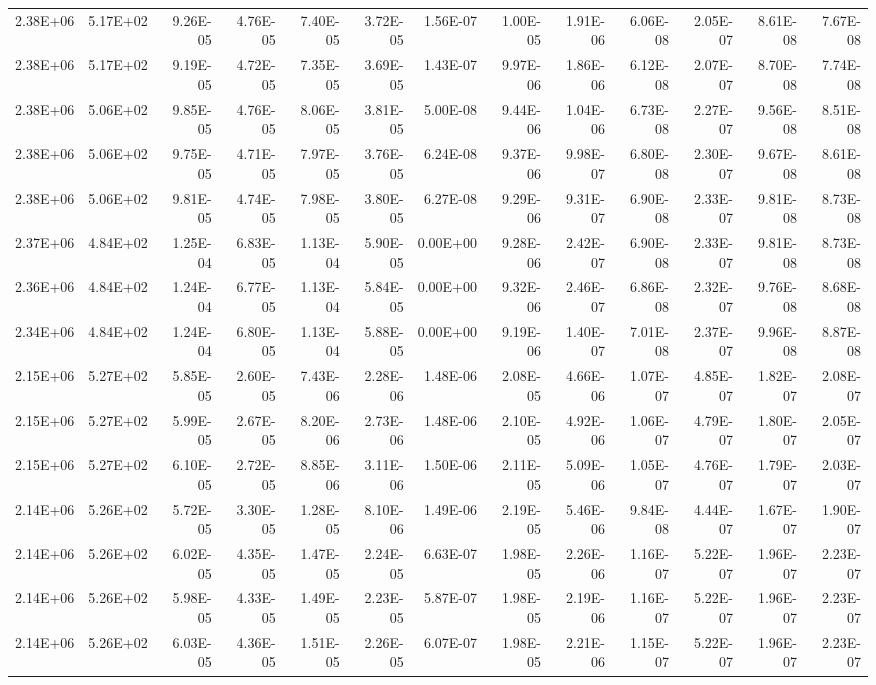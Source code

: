 \begin{tabular}{rrrrrrrrrrrrr}
2.38E+06 & 5.17E+02 & 9.26E-05 & 4.76E-05 & 7.40E-05 & 3.72E-05 & 1.56E-07 & 1.00E-05 & 1.91E-06 & 6.06E-08 & 2.05E-07 & 8.61E-08 & 7.67E-08 \\
2.38E+06 & 5.17E+02 & 9.19E-05 & 4.72E-05 & 7.35E-05 & 3.69E-05 & 1.43E-07 & 9.97E-06 & 1.86E-06 & 6.12E-08 & 2.07E-07 & 8.70E-08 & 7.74E-08 \\
2.38E+06 & 5.06E+02 & 9.85E-05 & 4.76E-05 & 8.06E-05 & 3.81E-05 & 5.00E-08 & 9.44E-06 & 1.04E-06 & 6.73E-08 & 2.27E-07 & 9.56E-08 & 8.51E-08 \\
2.38E+06 & 5.06E+02 & 9.75E-05 & 4.71E-05 & 7.97E-05 & 3.76E-05 & 6.24E-08 & 9.37E-06 & 9.98E-07 & 6.80E-08 & 2.30E-07 & 9.67E-08 & 8.61E-08 \\
2.38E+06 & 5.06E+02 & 9.81E-05 & 4.74E-05 & 7.98E-05 & 3.80E-05 & 6.27E-08 & 9.29E-06 & 9.31E-07 & 6.90E-08 & 2.33E-07 & 9.81E-08 & 8.73E-08 \\
2.37E+06 & 4.84E+02 & 1.25E-04 & 6.83E-05 & 1.13E-04 & 5.90E-05 & 0.00E+00 & 9.28E-06 & 2.42E-07 & 6.90E-08 & 2.33E-07 & 9.81E-08 & 8.73E-08 \\
2.36E+06 & 4.84E+02 & 1.24E-04 & 6.77E-05 & 1.13E-04 & 5.84E-05 & 0.00E+00 & 9.32E-06 & 2.46E-07 & 6.86E-08 & 2.32E-07 & 9.76E-08 & 8.68E-08 \\
2.34E+06 & 4.84E+02 & 1.24E-04 & 6.80E-05 & 1.13E-04 & 5.88E-05 & 0.00E+00 & 9.19E-06 & 1.40E-07 & 7.01E-08 & 2.37E-07 & 9.96E-08 & 8.87E-08 \\
2.15E+06 & 5.27E+02 & 5.85E-05 & 2.60E-05 & 7.43E-06 & 2.28E-06 & 1.48E-06 & 2.08E-05 & 4.66E-06 & 1.07E-07 & 4.85E-07 & 1.82E-07 & 2.08E-07 \\
2.15E+06 & 5.27E+02 & 5.99E-05 & 2.67E-05 & 8.20E-06 & 2.73E-06 & 1.48E-06 & 2.10E-05 & 4.92E-06 & 1.06E-07 & 4.79E-07 & 1.80E-07 & 2.05E-07 \\
2.15E+06 & 5.27E+02 & 6.10E-05 & 2.72E-05 & 8.85E-06 & 3.11E-06 & 1.50E-06 & 2.11E-05 & 5.09E-06 & 1.05E-07 & 4.76E-07 & 1.79E-07 & 2.03E-07 \\
2.14E+06 & 5.26E+02 & 5.72E-05 & 3.30E-05 & 1.28E-05 & 8.10E-06 & 1.49E-06 & 2.19E-05 & 5.46E-06 & 9.84E-08 & 4.44E-07 & 1.67E-07 & 1.90E-07 \\
2.14E+06 & 5.26E+02 & 6.02E-05 & 4.35E-05 & 1.47E-05 & 2.24E-05 & 6.63E-07 & 1.98E-05 & 2.26E-06 & 1.16E-07 & 5.22E-07 & 1.96E-07 & 2.23E-07 \\
2.14E+06 & 5.26E+02 & 5.98E-05 & 4.33E-05 & 1.49E-05 & 2.23E-05 & 5.87E-07 & 1.98E-05 & 2.19E-06 & 1.16E-07 & 5.22E-07 & 1.96E-07 & 2.23E-07 \\
2.14E+06 & 5.26E+02 & 6.03E-05 & 4.36E-05 & 1.51E-05 & 2.26E-05 & 6.07E-07 & 1.98E-05 & 2.21E-06 & 1.15E-07 & 5.22E-07 & 1.96E-07 & 2.23E-07 \\

\end{tabular}
